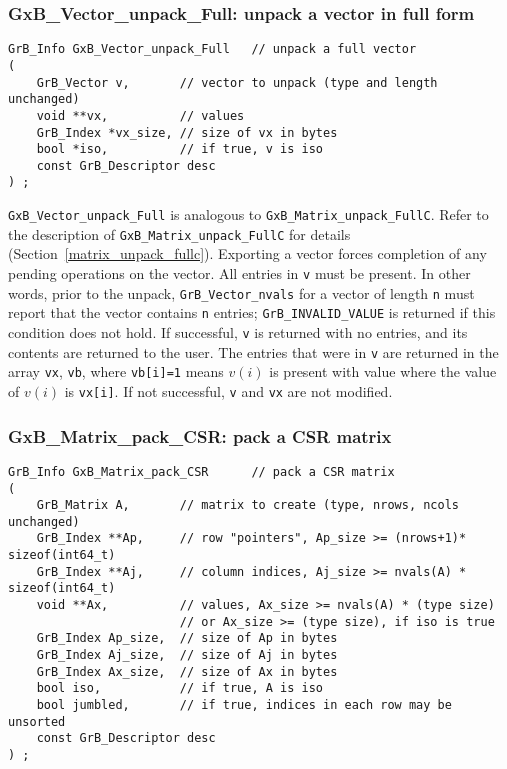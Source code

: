 \documentclass[12pt]{article}
\begin{document}
{\subsubsection{{\sf GxB\_Vector\_unpack\_Full:} unpack a vector in full form}
\label{vector_unpack_full}

\begin{mdframed}[userdefinedwidth=6in]
{\footnotesize
\begin{verbatim}
GrB_Info GxB_Vector_unpack_Full   // unpack a full vector
(
    GrB_Vector v,       // vector to unpack (type and length unchanged)
    void **vx,          // values
    GrB_Index *vx_size, // size of vx in bytes
    bool *iso,          // if true, v is iso
    const GrB_Descriptor desc
) ;
\end{verbatim}
} \end{mdframed}

\verb'GxB_Vector_unpack_Full' is analogous to \verb'GxB_Matrix_unpack_FullC'.
Refer to the description of \verb'GxB_Matrix_unpack_FullC' for details
(Section~\ref{matrix_unpack_fullc}).
Exporting a vector forces completion of any pending operations on the vector.
All entries in \verb'v' must be present.  In other words, prior to the unpack,
\verb'GrB_Vector_nvals' for a vector of length \verb'n' must report that the
vector contains \verb'n' entries; \verb'GrB_INVALID_VALUE' is returned if this
condition does not hold.
If successful, \verb'v' is returned with no entries, and its contents are
returned to the user. The entries
that were in \verb'v' are returned in the array \verb'vx', \verb'vb', where
\verb'vb[i]=1' means $v(i)$ is present with value where the value of $v(i)$ is
\verb'vx[i]'.
If not successful, \verb'v' and \verb'vx' are not modified.

\newpage
\subsubsection{{\sf GxB\_Matrix\_pack\_CSR:} pack a CSR matrix}
\label{matrix_pack_csr}

\begin{mdframed}[userdefinedwidth=6in]
{\footnotesize
\begin{verbatim}
GrB_Info GxB_Matrix_pack_CSR      // pack a CSR matrix
(
    GrB_Matrix A,       // matrix to create (type, nrows, ncols unchanged)
    GrB_Index **Ap,     // row "pointers", Ap_size >= (nrows+1)* sizeof(int64_t)
    GrB_Index **Aj,     // column indices, Aj_size >= nvals(A) * sizeof(int64_t)
    void **Ax,          // values, Ax_size >= nvals(A) * (type size)
                        // or Ax_size >= (type size), if iso is true
    GrB_Index Ap_size,  // size of Ap in bytes
    GrB_Index Aj_size,  // size of Aj in bytes
    GrB_Index Ax_size,  // size of Ax in bytes
    bool iso,           // if true, A is iso
    bool jumbled,       // if true, indices in each row may be unsorted
    const GrB_Descriptor desc
) ;
\end{verbatim}
} \end{mdframed}

}
\end{document}
